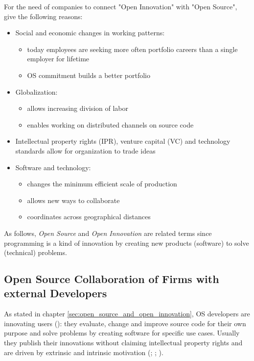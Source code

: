 For the need of companies to connect "Open Innovation" with "Open Source",  \cite{dahlander2010open} give the following reasons:

\begin{itemize}
  \item Social and economic changes in working patterns:
	\begin{itemize}
		\item today employees are seeking more often portfolio careers than a single employer for lifetime
		\item OS commitment builds a better portfolio
	\end{itemize}
  \item Globalization:
	\begin{itemize}
		\item allows increasing division of labor
		\item enables working on distributed channels on source code
	\end{itemize}
  \item Intellectual property rights (IPR), venture capital (VC) and technology standards allow for organization to trade ideas
  \item Software and technology:
	\begin{itemize}
		\item changes the minimum efficient scale of production
		\item allows new ways to collaborate
		\item coordinates across geographical distances
	\end{itemize}
\end{itemize}

As follows, \textit{Open Source} and \textit{Open Innovation} are related terms since programming is a kind of innovation by creating new products (software) to solve (technical) problems.

\subsection{Open Source Collaboration of Firms with external Developers}

As stated in chapter \ref{sec:open_source_and_open_innovation}, OS developers are innovating users (\cite{von2005democratizing}): they evaluate, change and improve source code for their own purpose and solve problems by creating software for specific use cases. Usually they publish their innovations without claiming intellectual property rights and are driven by extrinsic and intrinsic motivation (\cite{hertel2003motivation}; \cite{hars2001working}; \cite{lakhani2002boston}).

